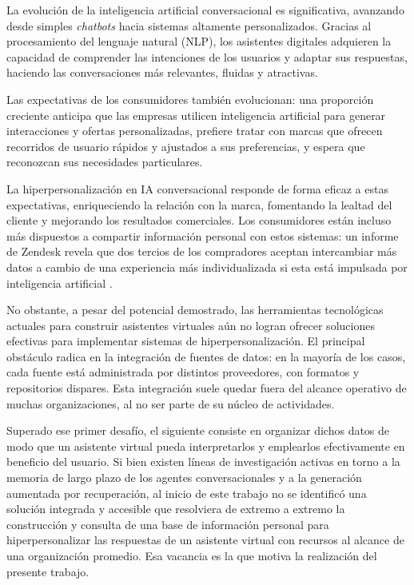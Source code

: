 La evolución de la inteligencia artificial conversacional es significativa, avanzando desde simples \textit{chatbots} hacia sistemas altamente personalizados. Gracias al procesamiento del lenguaje natural (NLP), los asistentes digitales adquieren la capacidad de comprender las intenciones de los usuarios y adaptar sus respuestas, haciendo las conversaciones más relevantes, fluidas y atractivas.

Las expectativas de los consumidores también evolucionan: una proporción creciente anticipa que las empresas utilicen inteligencia artificial para generar interacciones y ofertas personalizadas, prefiere tratar con marcas que ofrecen recorridos de usuario rápidos y ajustados a sus preferencias, y espera que reconozcan sus necesidades particulares.

La hiperpersonalización en IA conversacional responde de forma eficaz a estas expectativas, enriqueciendo la relación con la marca, fomentando la lealtad del cliente y mejorando los resultados comerciales. Los consumidores están incluso más dispuestos a compartir información personal con estos sistemas: un informe de Zendesk revela que dos tercios de los compradores aceptan intercambiar más datos a cambio de una experiencia más individualizada si esta está impulsada por inteligencia artificial \parencite{Zendesk2024}.

No obstante, a pesar del potencial demostrado, las herramientas tecnológicas actuales para construir asistentes virtuales aún no logran ofrecer soluciones efectivas para implementar sistemas de hiperpersonalización. El principal obstáculo radica en la integración de fuentes de datos: en la mayoría de los casos, cada fuente está administrada por distintos proveedores, con formatos y repositorios dispares. Esta integración suele quedar fuera del alcance operativo de muchas organizaciones, al no ser parte de su núcleo de actividades.

Superado ese primer desafío, el siguiente consiste en organizar dichos datos de modo que un asistente virtual pueda interpretarlos y emplearlos efectivamente en beneficio del usuario. Si bien existen líneas de investigación activas en torno a la memoria de largo plazo de los agentes conversacionales y a la generación aumentada por recuperación, al inicio de este trabajo no se identificó una solución integrada y accesible que resolviera de extremo a extremo la construcción y consulta de una base de información personal para hiperpersonalizar las respuestas de un asistente virtual con recursos al alcance de una organización promedio. Esa vacancia es la que motiva la realización del presente trabajo.

